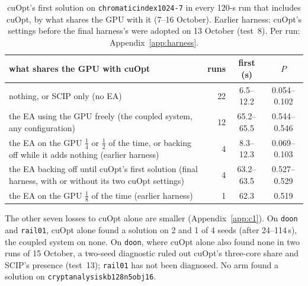 \begin{table}[htbp]\centering\footnotesize
\caption{cuOpt's first solution on \texttt{chromaticindex1024-7} in every 120-s run that includes cuOpt, by what
shares the GPU with it (7--16 October). Earlier harness: cuOpt's settings before the final harness's were adopted on
13 October (test~8). Per run: Appendix~\ref{app:harness}.}\label{tab:loss}
\begin{tabular}{>{\raggedright}p{10.5cm}rcc}
\toprule
what shares the GPU with cuOpt & runs & first (s) & $P$ \\
\midrule
nothing, or SCIP only (no EA) & 22 & 6.5--12.2 & 0.054--0.102 \\
the EA using the GPU freely (the coupled system, any configuration) & 12 & 65.2--65.5 & 0.544--0.546 \\
the EA on the GPU $\frac14$ or $\frac12$ of the time, or backing off while it adds nothing (earlier harness) & 4 &
  8.3--12.3 & 0.069--0.103 \\
the EA backing off until cuOpt's first solution (final harness, with or without its two cuOpt settings) & 4 &
  63.2--63.5 & 0.527--0.529 \\
the EA on the GPU $\frac18$ of the time (earlier harness) & 1 & 62.3 & 0.519 \\
\bottomrule
\end{tabular}
\end{table}

The other seven losses to cuOpt alone are smaller (Appendix~\ref{app:c1}). On \texttt{doon} and \texttt{rail01},
cuOpt alone found a solution on 2 and 1 of 4 seeds (after 24--114\,s), the coupled system on none. On \texttt{doon}, where cuOpt
alone also found none in two runs of 15 October, a two-seed diagnostic ruled out cuOpt's three-core share and SCIP's
presence (test~13); \texttt{rail01} has not been
diagnosed. No arm found a solution on \texttt{cryptanalysiskb128n5obj16}.
\FloatBarrier
